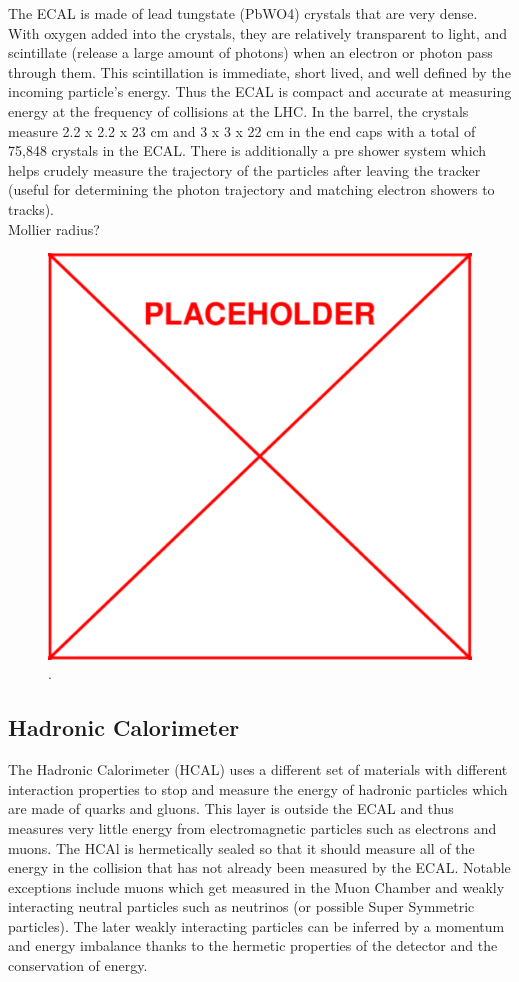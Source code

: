 	The ECAL is made of lead tungstate (PbWO4) crystals that are very dense. With oxygen added into the crystals, they are relatively transparent to light, and scintillate (release a large amount of photons) when an electron or photon pass through them. This scintillation is immediate, short lived, and well defined by the incoming particle's energy. Thus the ECAL is compact and accurate at measuring energy at the frequency of collisions at the LHC. In the barrel, the crystals measure 2.2 x 2.2 x 23 cm and 3 x 3 x 22 cm in the end caps with a total of 75,848 crystals in the ECAL. There is additionally a pre shower system which helps crudely measure the trajectory of the particles after leaving the tracker (useful for determining the photon trajectory and matching electron showers to tracks).\\
	 
	 Mollier radius?
	 
						\begin{figure}[h]
\begin{center}
\includegraphics[width=0.48\linewidth]{Figs/placeholder.pdf}
\caption{\label{fig:ecal}
.
}
\end{center}
\end{figure}
	
	\subsection{Hadronic Calorimeter}
	\label{sec:hadronic_calorimeter}
	The Hadronic Calorimeter (HCAL) uses a different set of materials with different interaction properties to stop and measure the energy of hadronic particles which are made of quarks and gluons. This layer is outside the ECAL and thus measures very little energy from electromagnetic particles such as electrons and muons. The HCAl is hermetically sealed so that it should measure all of the energy in the collision that has not already been measured by the ECAL. Notable exceptions include muons which get measured in the Muon Chamber and weakly interacting neutral particles such as neutrinos (or possible Super Symmetric particles). The later weakly interacting particles can be inferred by a momentum and energy imbalance thanks to the hermetic properties of the detector and the conservation of energy.\\
	
